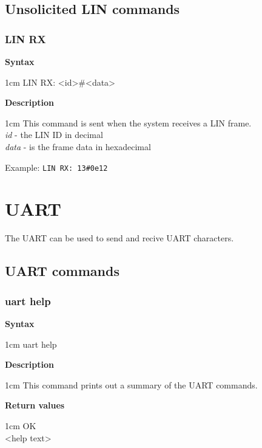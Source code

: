 \documentclass{article}[a4paper]
\begin{document}
\subsection{Unsolicited LIN commands}

\subsubsection{LIN RX}
\begin{tcolorbox}
	{\bf Syntax}

	 1cm \dimexpr\linewidth-2cm\relax
	LIN RX: <id>\#<data>

	\medskip
	{\bf Description}

	 1cm \dimexpr\linewidth-2cm\relax
	This command is sent when the system receives a LIN frame.
	\medskip \\
	{\it id} - the LIN ID in decimal \\
	{\it data} - is the frame data in hexadecimal

	\medskip
	Example: \texttt{LIN RX: 13\#0e12}
\end{tcolorbox}

\section{UART}

The UART can be used to send and recive UART characters.


\subsection{UART commands}
\subsubsection{uart help}
\begin{tcolorbox}
	{\bf Syntax}

	 1cm \dimexpr\linewidth-2cm\relax
	uart help

	\medskip
	{\bf Description}

	 1cm \dimexpr\linewidth-2cm\relax
	This command prints out a summary of the UART commands.

	\medskip
	{\bf Return values}

	 1cm \dimexpr\linewidth-2cm\relax
	OK \\
	<help text>
\end{tcolorbox}
\end{document}
